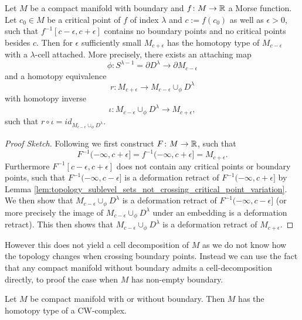     \begin{theorem}
        \label{thm:topology_when_crossing_critical_point}
        Let $M$ be a compact manifold with boundary and $f \colon M \to \mathbb{R}$ a Morse function. Let $c_0 \in M$ be a critical point of $f$ of index $\lambda$ and $c := f(c_0)$ as well as $\epsilon > 0$, such that $f^{-1}[c-\epsilon,c+\epsilon]$ contains no boundary points and no critical points besides $c$. Then for $\epsilon$ sufficiently small $M_{c+\epsilon}$ has the homotopy type of $M_{c-\epsilon}$ with a $\lambda$-cell attached. More precisely, there exists an attaching map 
        \[
            \phi \colon S^{\lambda - 1} = \partial D^\lambda \to \partial M_{c-\epsilon}
        \] and a homotopy equivalence 
        \[
        r \colon M_{c+\epsilon} \to M_{c-\epsilon} \cup_\phi D^\lambda
        \]
        with homotopy inverse 
        \[
        \iota \colon M_{c-\epsilon} \cup_\phi D^\lambda \to M_{c+\epsilon},
        \]
        such that $r \circ \iota = id_{M_{c-\epsilon} \cup_\phi D^\lambda}$.
    \end{theorem}
    \begin{proof}[Proof Sketch]
        Following \cite{milnor1963morse} we first construct $F \colon M \to \mathbb{R}$, such that 
        $$F^{-1}(-\infty,c+\epsilon] = f^{-1}(-\infty,c+\epsilon] = M_{c+\epsilon}.$$
        Furthermore $F^{-1}[c-\epsilon,c+\epsilon]$ does not contain any critical points or boundary points, such that $F^{-1}(-\infty,c-\epsilon]$ is a deformation retract of $F^{-1}(-\infty,c+\epsilon]$ by Lemma \ref{lem:topology_sublevel_sets_not_crossing_critical_point_variation}. We then show that $M_{c-\epsilon} \cup_\phi D^\lambda$ is a deformation retract of $F^{-1}(-\infty,c-\epsilon]$ (or more precisely the image of $M_{c-\epsilon} \cup_\phi D^\lambda$ under an embedding is a deformation retract). This then shows that $M_{c-\epsilon} \cup_\phi D^\lambda$ is a deformation retract of $M_{c+\epsilon}$.
    \end{proof}
    
    However this does not yield a cell decomposition of $M$ as we do not know how the topology changes when crossing boundary points. Instead we can use the fact that any compact manifold without boundary admits a cell-decomposition directly, to proof the case when $M$ has non-empty boundary.

    \begin{theorem}
        \label{thm:cell_decomp}
        Let $M$ be compact manifold with or without boundary. Then $M$ has the homotopy type of a CW-complex.
    \end{theorem}

